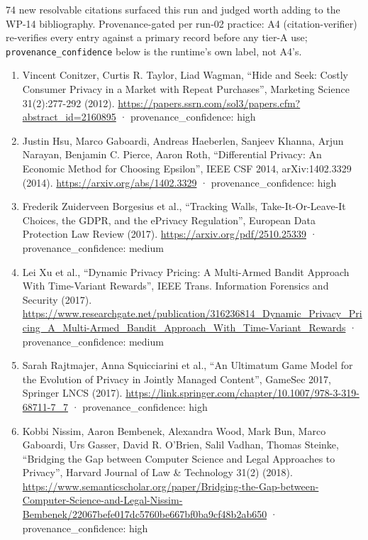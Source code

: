 \documentclass[
  11pt,
]{article}
\providecommand{\tightlist}{%
  \setlength{\itemsep}{0pt}\setlength{\parskip}{0pt}}
\begin{document}
74 new resolvable citations surfaced this run and judged worth adding to
the WP-14 bibliography. Provenance-gated per run-02 practice: A4
(citation-verifier) re-verifies every entry against a primary record
before any tier-A use; \texttt{provenance\_confidence} below is the
runtime's own label, not A4's.

\begin{enumerate}
\def\labelenumi{\arabic{enumi}.}
\tightlist
\item
  Vincent Conitzer, Curtis R. Taylor, Liad Wagman, ``Hide and Seek:
  Costly Consumer Privacy in a Market with Repeat Purchases'', Marketing
  Science 31(2):277-292 (2012).
  \url{https://papers.ssrn.com/sol3/papers.cfm?abstract_id=2160895} ·
  provenance\_confidence: high
\item
  Justin Hsu, Marco Gaboardi, Andreas Haeberlen, Sanjeev Khanna, Arjun
  Narayan, Benjamin C. Pierce, Aaron Roth, ``Differential Privacy: An
  Economic Method for Choosing Epsilon'', IEEE CSF 2014, arXiv:1402.3329
  (2014). \url{https://arxiv.org/abs/1402.3329} ·
  provenance\_confidence: high
\item
  Frederik Zuiderveen Borgesius et al., ``Tracking Walls,
  Take-It-Or-Leave-It Choices, the GDPR, and the ePrivacy Regulation'',
  European Data Protection Law Review (2017).
  \url{https://arxiv.org/pdf/2510.25339} · provenance\_confidence:
  medium
\item
  Lei Xu et al., ``Dynamic Privacy Pricing: A Multi-Armed Bandit
  Approach With Time-Variant Rewards'', IEEE Trans. Information
  Forensics and Security (2017).
  \url{https://www.researchgate.net/publication/316236814_Dynamic_Privacy_Pricing_A_Multi-Armed_Bandit_Approach_With_Time-Variant_Rewards}
  · provenance\_confidence: medium
\item
  Sarah Rajtmajer, Anna Squicciarini et al., ``An Ultimatum Game Model
  for the Evolution of Privacy in Jointly Managed Content'', GameSec
  2017, Springer LNCS (2017).
  \url{https://link.springer.com/chapter/10.1007/978-3-319-68711-7_7} ·
  provenance\_confidence: high
\item
  Kobbi Nissim, Aaron Bembenek, Alexandra Wood, Mark Bun, Marco
  Gaboardi, Urs Gasser, David R. O'Brien, Salil Vadhan, Thomas Steinke,
  ``Bridging the Gap between Computer Science and Legal Approaches to
  Privacy'', Harvard Journal of Law \& Technology 31(2) (2018).
  \url{https://www.semanticscholar.org/paper/Bridging-the-Gap-between-Computer-Science-and-Legal-Nissim-Bembenek/22067befe017dc5760be667bf0ba9cf48b2ab650}
  · provenance\_confidence: high

\end{enumerate}
\end{document}
